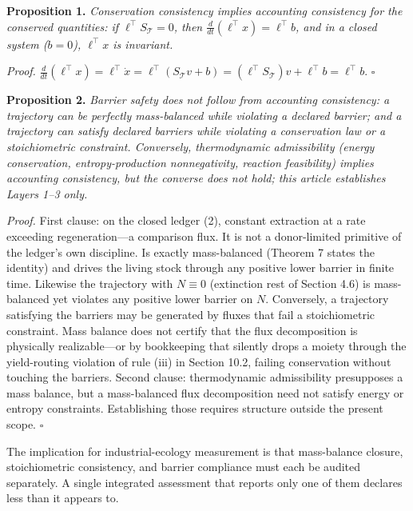 \documentclass[11pt]{article}
\begin{document}
\textbf{Proposition 1.} \emph{Conservation consistency implies
accounting consistency for the conserved quantities: if
\(\ell^\top S_{\mathcal{T}} = 0\), then
\(\frac{d}{dt}(\ell^\top x) = \ell^\top b\), and in a closed system
(\(b = 0\)), \(\ell^\top x\) is invariant.}

\emph{Proof.}
\(\frac{d}{dt}(\ell^\top x) = \ell^\top \dot x = \ell^\top(S_{\mathcal{T}} v + b) = (\ell^\top S_{\mathcal{T}}) v + \ell^\top b = \ell^\top b\).
\ensuremath{\square}

\textbf{Proposition 2.} \emph{Barrier safety does not follow from
accounting consistency: a trajectory can be perfectly mass-balanced
while violating a declared barrier; and a trajectory can satisfy
declared barriers while violating a conservation law or a stoichiometric
constraint. Conversely, thermodynamic admissibility (energy
conservation, entropy-production nonnegativity, reaction feasibility)
implies accounting consistency, but the converse does not hold; this
article establishes Layers 1--3 only.}

\emph{Proof.} First clause: on the closed ledger (2), constant extraction at a rate exceeding regeneration---a comparison flux. It is not a donor-limited primitive of the ledger's own discipline. Is exactly mass-balanced (Theorem 7 states the identity) and drives the living stock through any positive lower barrier in finite time. Likewise the trajectory with \(N \equiv 0\) (extinction rest of Section 4.6) is mass-balanced yet violates any positive lower barrier on \(N\). Conversely, a trajectory satisfying the barriers may be generated by fluxes that fail a stoichiometric constraint. Mass balance does not certify that the flux decomposition is physically realizable---or by bookkeeping that silently drops a moiety through the yield-routing violation of rule (iii) in Section 10.2, failing conservation without touching the barriers. Second clause: thermodynamic admissibility presupposes a mass balance, but a mass-balanced flux decomposition need not satisfy energy or entropy constraints. Establishing those requires structure outside the present scope. \ensuremath{\square}

The implication for industrial-ecology measurement is that mass-balance
closure, stoichiometric consistency, and barrier compliance must each be
audited separately. A single integrated assessment that reports only one
of them declares less than it appears to.
\end{document}
